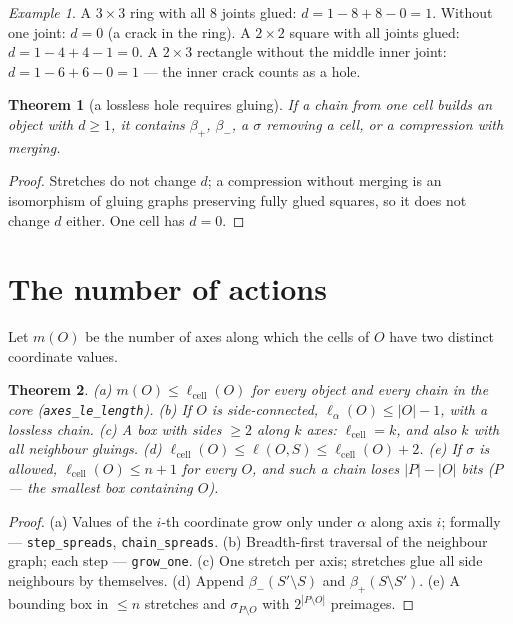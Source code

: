 \documentclass[11pt,a4paper]{article}
\theoremstyle{plain}
\newtheorem{theorem}{Theorem}[section]
\theoremstyle{definition}
\theoremstyle{remark}
\newtheorem*{example}{Example}
\newcommand{\lc}{\ell_{\mathrm{cell}}}
\newcommand{\lean}[1]{\texttt{#1}}
\begin{document}
\begin{example}
A $3\times3$ ring with all 8 joints glued: $d=1-8+8-0=1$. Without one joint: $d=0$ (a crack in the ring). A $2\times2$ square with all joints glued: $d=1-4+4-1=0$. A $2\times3$ rectangle without the middle inner joint: $d=1-6+6-0=1$ — the inner crack counts as a hole.
\end{example}

\begin{theorem}[a lossless hole requires gluing]
If a chain from one cell builds an object with $d\ge1$, it contains $\beta_+$, $\beta_-$, a $\sigma$ removing a cell, or a compression with merging.
\end{theorem}
\begin{proof}
Stretches do not change $d$; a compression without merging is an isomorphism of gluing graphs preserving fully glued squares, so it does not change $d$ either. One cell has $d=0$.
\end{proof}

\section{The number of actions}\label{sec:count}

Let $m(O)$ be the number of axes along which the cells of $O$ have two distinct coordinate values.

\begin{theorem}\label{thm:bounds}
(a) $m(O)\le\lc(O)$ for every object and every chain in the core (\lean{axes\_le\_length}). (b) If $O$ is side-connected, $\ell_\alpha(O)\le|O|-1$, with a lossless chain. (c) A box with sides $\ge2$ along $k$ axes: $\lc=k$, and also $k$ with all neighbour gluings. (d) $\lc(O)\le\ell(O,S)\le\lc(O)+2$. (e) If $\sigma$ is allowed, $\lc(O)\le n+1$ for every $O$, and such a chain loses $|P|-|O|$ bits ($P$ — the smallest box containing $O$).
\end{theorem}
\begin{proof}
(a) Values of the $i$-th coordinate grow only under $\alpha$ along axis $i$; formally — \lean{step\_spreads}, \lean{chain\_spreads}. (b) Breadth-first traversal of the neighbour graph; each step — \lean{grow\_one}. (c) One stretch per axis; stretches glue all side neighbours by themselves. (d) Append $\beta_-(S'\setminus S)$ and $\beta_+(S\setminus S')$. (e) A bounding box in $\le n$ stretches and $\sigma_{P\setminus O}$ with $2^{|P\setminus O|}$ preimages.
\end{proof}
\end{document}
